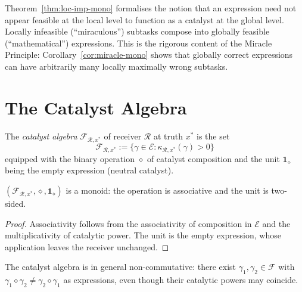\begin{remark}
Theorem~\ref{thm:loc-imp-mono} formalises the notion that an expression need
not appear feasible at the local level to function as a catalyst at the global
level.  Locally infeasible (``miraculous'') subtasks compose into globally
feasible (``mathematical'') expressions.  This is the rigorous content of the
Miracle Principle: Corollary~\ref{cor:miracle-mono} shows that globally correct
expressions can have arbitrarily many locally maximally wrong subtasks.
\end{remark}

\section{The Catalyst Algebra}
\label{sec:ch14-algebra}

\begin{definition}\label{def:cat-algebra-mono}
The \emph{catalyst algebra} $\mathcal{F}_{\mathcal{R}, x^{*}}$ of receiver
$\mathcal{R}$ at truth $x^{*}$ is the set
\[
  \mathcal{F}_{\mathcal{R}, x^{*}}
  := \{\gamma \in \mathcal{E} : \kappa_{\mathcal{R}, x^{*}}(\gamma) > 0\}
\]
equipped with the binary operation $\diamond$ of catalyst composition and the
unit $\mathbf{1}_{\diamond}$ being the empty expression (neutral catalyst).
\end{definition}

\begin{proposition}\label{prop:monoid-mono}
$(\mathcal{F}_{\mathcal{R}, x^{*}}, \diamond, \mathbf{1}_{\diamond})$ is a
monoid: the operation is associative and the unit is two-sided.
\end{proposition}

\begin{proof}
Associativity follows from the associativity of composition in $\mathcal{E}$
and the multiplicativity of catalytic power.  The unit is the empty expression,
whose application leaves the receiver unchanged.
\end{proof}

\begin{proposition}\label{prop:non-comm-mono}
The catalyst algebra is in general non-commutative: there exist
$\gamma_1, \gamma_2 \in \mathcal{F}$ with
$\gamma_1 \diamond \gamma_2 \neq \gamma_2 \diamond \gamma_1$ as expressions,
even though their catalytic powers may coincide.
\end{proposition}

